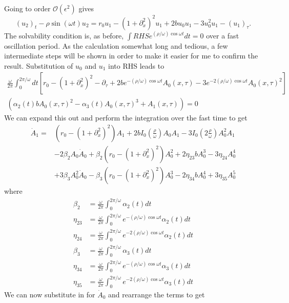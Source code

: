 \documentclass[pre,preprint,superscriptaddress]{revtex4-1}
\begin{document}
Going to order  $\mathcal{O}(\epsilon^2)$ gives
\begin{equation}
(u_2)_t-\rho \sin(\omega t) u_2= r_0 u_1-\left(1+\partial_{x}^2\right)^2u_1+ 2b u_0u_1-3u_0^2u_1 -(u_1)_{\tau}\label{eq:SH}.
\end{equation}
The solvability condition is, as before, $\int RHS e^{(\rho/\omega) \cos\omega t}dt=0$ over a fast oscillation period.  As the calculation somewhat long and tedious, a few intermediate steps will be shown in order to make it easier for me to confirm the result. Substitution of $u_0$ and $u_1$ into RHS leads to 
\begin{align}
\frac{\omega}{2\pi}\int_0^{2\pi/\omega}dt\left[r_0-\left(1+\partial_{x}^2\right)^2 -\partial_{\tau}+2 b  e^{-(\rho/\omega) \cos\omega t}A_0(x,\tau)-3e^{-2(\rho/\omega) \cos\omega t}A_0(x,\tau)^2\right]\\ \nonumber
\left( \alpha_2(t) b A_0(x,\tau)^2- \alpha_3(t)A_0(x,\tau)^3 + A_1(x,\tau)\right)=0
\end{align}
We can expand this out and perform the integration over the fast time to get
\begin{align}
\dot{A}_1=& \left(r_0 -\left(1+\partial_{x}^2\right)^2\right)A_1 + 2 b I_0(\tfrac{\rho}{\omega})A_0 A_ 1 - 3I_0(2\tfrac{\rho}{\omega}) A_0^2 A_1 \\ \nonumber
&-2\beta_2 A_0\dot{A}_0 + \beta_2\left(r_0 -\left(1+\partial_{x}^2\right)^2\right)A_0^2 + 2\eta_{23} b A_0^3 -3\eta_{24} A_0^4 \\ \nonumber
&+3\beta_3 A_0^2 \dot{A}_0 - \beta_3\left(r_0 -\left(1+\partial_{x}^2\right)^2\right)A_0^3- 2\eta_{34} b A_0^4 +3\eta_{35} A_0^5 
\end{align}
where
 \begin{align}
\beta_2&=\frac{\omega}{2\pi}\int_0^{2\pi/\omega}\alpha_2(t)dt\\
\eta_{23}&=\frac{\omega}{2\pi}\int_0^{2\pi/\omega} e^{-(\rho/\omega) \cos\omega t}\alpha_2(t)dt\\ 
\eta_{24}&=\frac{\omega}{2\pi}\int_0^{2\pi/\omega} e^{-2(\rho/\omega) \cos\omega t}\alpha_2(t)dt\\ 
\beta_3&=\frac{\omega}{2\pi}\int_0^{2\pi/\omega}\alpha_3(t)dt\\
\eta_{34}&=\frac{\omega}{2\pi}\int_0^{2\pi/\omega} e^{-(\rho/\omega) \cos\omega t}\alpha_3(t)dt\\ 
\eta_{35}&=\frac{\omega}{2\pi}\int_0^{2\pi/\omega} e^{-2(\rho/\omega) \cos\omega t}\alpha_3(t)dt
\end{align}
We can now substitute in for $\dot{A}_0$ and rearrange the terms to get
\end{document}
